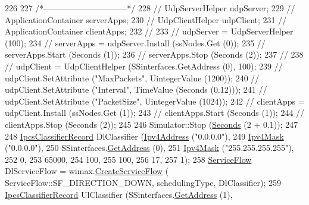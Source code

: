 \begin{DoxyCode}
226 
227   \textcolor{comment}{/*------------------------------*/}
228   \textcolor{comment}{//  UdpServerHelper udpServer;}
229   \textcolor{comment}{//  ApplicationContainer serverApps;}
230   \textcolor{comment}{//  UdpClientHelper udpClient;}
231   \textcolor{comment}{//  ApplicationContainer clientApps;}
232   \textcolor{comment}{//}
233   \textcolor{comment}{//  udpServer = UdpServerHelper (100);}
234   \textcolor{comment}{//  serverApps = udpServer.Install (ssNodes.Get (0));}
235   \textcolor{comment}{//  serverApps.Start (Seconds (1));}
236   \textcolor{comment}{//  serverApps.Stop (Seconds (2));}
237   \textcolor{comment}{//}
238   \textcolor{comment}{//  udpClient = UdpClientHelper (SSinterfaces.GetAddress (0), 100);}
239   \textcolor{comment}{//  udpClient.SetAttribute ("MaxPackets", UintegerValue (1200));}
240   \textcolor{comment}{//  udpClient.SetAttribute ("Interval", TimeValue (Seconds (0.12)));}
241   \textcolor{comment}{//  udpClient.SetAttribute ("PacketSize", UintegerValue (1024));}
242   \textcolor{comment}{//  clientApps = udpClient.Install (ssNodes.Get (1));}
243   \textcolor{comment}{//  clientApps.Start (Seconds (1));}
244   \textcolor{comment}{//  clientApps.Stop (Seconds (2));}
245 
246   Simulator::Stop (\hyperlink{group__timecivil_ga33c34b816f8ff6628e33d5c8e9713b9e}{Seconds} (2 + 0.1));
247 
248   \hyperlink{classns3_1_1IpcsClassifierRecord}{IpcsClassifierRecord} DlClassifier (\hyperlink{classns3_1_1Ipv4Address}{Ipv4Address} (\textcolor{stringliteral}{"0.0.0.0"}),
249                                      \hyperlink{classns3_1_1Ipv4Mask}{Ipv4Mask} (\textcolor{stringliteral}{"0.0.0.0"}),
250                                      SSinterfaces.\hyperlink{classns3_1_1Ipv4InterfaceContainer_ae63208dcd222be986822937ee4aa828c}{GetAddress} (0),
251                                      \hyperlink{classns3_1_1Ipv4Mask}{Ipv4Mask} (\textcolor{stringliteral}{"255.255.255.255"}),
252                                      0,
253                                      65000,
254                                      100,
255                                      100,
256                                      17,
257                                      1);
258   \hyperlink{classns3_1_1ServiceFlow}{ServiceFlow} DlServiceFlow = wimax.\hyperlink{classns3_1_1WimaxHelper_aed0c1ffdcd62234c14965f899efc88c1}{CreateServiceFlow} (
      ServiceFlow::SF\_DIRECTION\_DOWN, schedulingType, DlClassifier);
259   \hyperlink{classns3_1_1IpcsClassifierRecord}{IpcsClassifierRecord} UlClassifier (SSinterfaces.\hyperlink{classns3_1_1Ipv4InterfaceContainer_ae63208dcd222be986822937ee4aa828c}{GetAddress} (1),

\end{DoxyCode}
